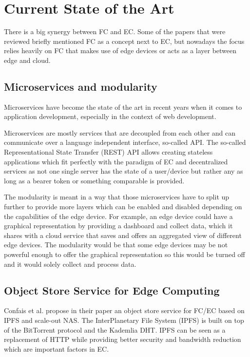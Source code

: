 \section{Current State of the Art}\label{sec:evaluation} 

There is a big synergy between FC and EC. Some of the papers that were reviewed briefly mentioned FC as a concept next to EC, but nowadays the focus relies heavily on FC that makes use of edge devices or acts as a layer between edge and cloud.

\subsection{Microservices and modularity}
Microservices have become the state of the art in recent years when it comes to application development, especially in the context of web development.

Microservices are mostly services that are decoupled from each other and can communicate over a language independent interface, so-called API. The so-called Representational State Transfer (REST) API allows creating stateless applications which fit perfectly with the paradigm of EC and decentralized services as not one single server has the state of a user/device but rather any as long as a bearer token or something comparable is provided.

The modularity is meant in a way that those microservices have to split up further to provide more layers which can be enabled and disabled depending on the capabilities of the edge device. For example, an edge device could have a graphical representation by providing a dashboard and collect data, which it shares with a cloud service that saves and offers an aggregated view of different edge devices. The modularity would be that some edge devices may be not powerful enough to offer the graphical representation so this would be turned off and it would solely collect and process data.

\subsection{Object Store Service for Edge Computing}
Confais et al. propose in their paper \cite{8014358} an object store service for FC/EC based on IPFS and scale-out NAS.
The InterPlanetary File System (IPFS) is built on top of the BitTorrent protocol and the Kademlia DHT. IPFS can be seen as a replacement of HTTP while providing better security and bandwidth reduction which are important factors in EC.

